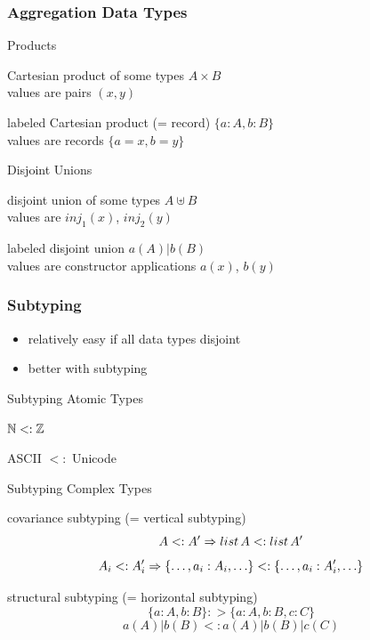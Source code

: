 \documentclass{beamer}
\begin{document}
\begin{frame}\frametitle{Aggregation Data Types}
\begin{blockitems}{Products}
 \item Cartesian product of some types $A\times B$ \\
 values are pairs $(x,y)$ 
 \item labeled Cartesian product (= record) $\{a: A, b: B\}$ \\
 values are records $\{a=x, b=y\}$
\end{blockitems}

\begin{blockitems}{Disjoint Unions}
 \item disjoint union of some types $A\uplus B$\\
  values are $inj_1(x)$, $inj_2(y)$
 \item labeled disjoint union $a(A)|b(B)$ \\
  values are constructor applications $a(x)$, $b(y)$
\end{blockitems}

\end{frame}

\begin{frame}\frametitle{Subtyping}
\begin{itemize}
 \item relatively easy if all data types disjoint
 \item better with subtyping
\end{itemize}

\begin{blockitems}{Subtyping Atomic Types}
 \item $\mathbb{N} <: \mathbb{Z}$
 \item ASCII $<:$ Unicode
\end{blockitems}

\begin{blockitems}{Subtyping Complex Types}
 \item covariance subtyping (= vertical subtyping)
  \[A <: A' \Rightarrow list\,A <: list\, A'\]
  \[A_i <: A_i' \Rightarrow \{\ldots, a_i:A_i,\ldots\} <: \{\ldots, a_i:A'_i,\ldots\}\]
 \item structural subtyping (= horizontal subtyping)
  \[\{a:A,b:B\} :> \{a:A,b:B,c:C\}\]
  \[a(A)|b(B) <: a(A)|b(B)|c(C)\]
\end{blockitems}
\end{frame}
\end{document}
